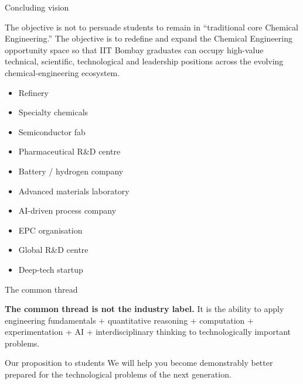 \documentclass[aspectratio=169,11pt]{beamer}
\newcommand{\key}[1]{\textbf{\color{IITblue}#1}}
\begin{document}
\begin{frame}{Concluding vision}
\begin{block}{The objective is not to persuade students to remain in ``traditional core Chemical Engineering.''}
The objective is to redefine and expand the Chemical Engineering opportunity space so that IIT Bombay graduates can occupy high-value technical, scientific, technological and leadership positions across the evolving chemical-engineering ecosystem.
\end{block}
\vspace{4mm}
\begin{itemize}
\item Refinery
\item Specialty chemicals
\item Semiconductor fab
\item Pharmaceutical R\&D centre
\item Battery / hydrogen company
\item Advanced materials laboratory
\item AI-driven process company
\item EPC organisation
\item Global R\&D centre
\item Deep-tech startup
\end{itemize}
\end{frame}

\begin{frame}{The common thread}
\begin{center}
\Large\key{The common thread is not the industry label.}
\vspace{6mm}
\Large It is the ability to apply
\vspace{2mm}
\Large engineering fundamentals + quantitative reasoning + computation + experimentation + AI + interdisciplinary thinking
\vspace{4mm}
\Large to technologically important problems.
\end{center}
\vspace{6mm}
\begin{block}{Our proposition to students}
We will help you become demonstrably better prepared for the technological problems of the next generation.
\end{block}
\end{frame}
\end{document}
